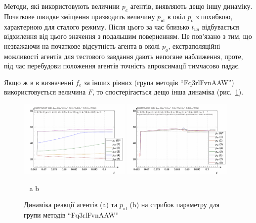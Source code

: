 Методи, які використовують величини
$p_e$ агентів, виявляють дещо іншу динаміку. Початкове швидке
зміщення призводить величину
$p_\mathrm{id}$ в окіл
$p_o$ з похибкою, характерною для сталого режиму. Після цього за
час близько
$t_{ua}$ відбувається відхилення від цього значення з подальшим
поверненням. Це пов'язано з тим, що незважаючи на початкове
відсутність агента в околі
$p_o$, екстраполяційні можливості агентів для тестового завдання
дають непогане наближення, проте, під час перебудови положення
агентів точність апроксимації тимчасово падає.


Якщо ж в в визначенні
$f_e$ за інших рівних (група методів ``Fq3rlFvnAAW'') використовується
величина
$F$, то спостерігається дещо інша динаміка (рис.~\ref{atu:f:Fq3rlFvnAAW_sign}).

\begin{figure}[htb!]
  \begin{center}
    \includegraphics[width=0.48\textwidth]{p/sign/qls-p_t_pi_m_Fq3rlFvnAAW_sign.png}
    \hfill
    \includegraphics[width=0.48\textwidth]{p/sign/qls-p_t_p_m_Fq3rlFvnAAW_sign.png}
  \end{center}
  \vspace{-1.0ex}
  \begin{center}
    ~ \hfill a \hfill\hfill b  \hfill ~
  \end{center}
  \vspace{-1.5ex}
  \caption{Динаміка реакції агентів (a) та $p_\mathrm{id}$ (b) на стрибок параметру для групи методів ``Fq3rlFvnAAW''}
  \label{atu:f:Fq3rlFvnAAW_sign}
\end{figure}


